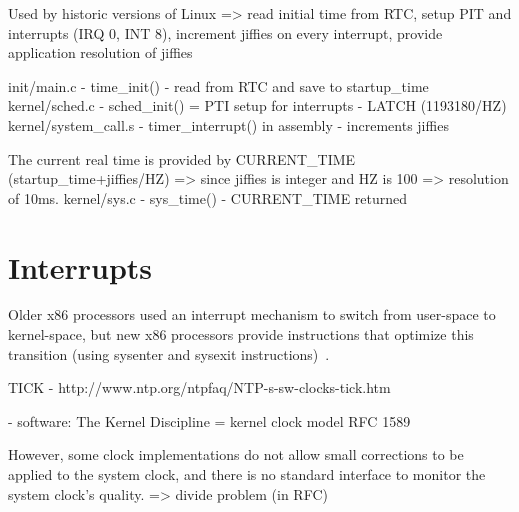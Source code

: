 Used by historic versions of Linux
=> read initial time from RTC, setup PIT and interrupts (IRQ 0, INT 8), increment jiffies on every interrupt, provide application resolution of jiffies

init/main.c - time\_init() - read from RTC and save to startup\_time
kernel/sched.c - sched\_init() = PTI setup for interrupts - LATCH (1193180/HZ)
kernel/system\_call.s - timer\_interrupt() in assembly - increments jiffies

The current real time is provided by CURRENT\_TIME (startup\_time+jiffies/HZ) => since jiffies is integer and HZ is 100 => resolution of 10ms.
kernel/sys.c - sys\_time() - CURRENT\_TIME returned

\section{Interrupts}
Older x86 processors used an interrupt mechanism to switch from
user-space to kernel-space, but new x86 processors provide instructions
that optimize this transition (using sysenter and sysexit instructions)~\cite{ibm-linux-system-calls}.


TICK - http://www.ntp.org/ntpfaq/NTP-s-sw-clocks-tick.htm


- software:
The Kernel Discipline =  kernel clock model RFC 1589

However, some clock implementations do not allow small corrections to be applied to the system clock, and there is no standard interface to monitor the system clock's quality.
=> divide problem (in RFC)


